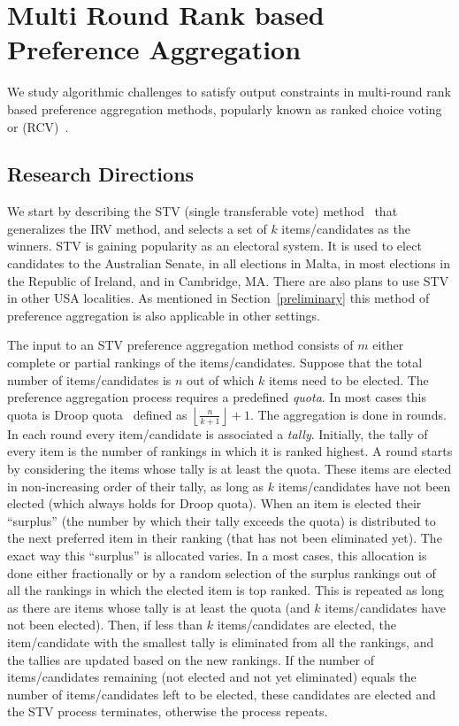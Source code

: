 \documentclass[11pt]{article}
\newcommand{\floor}[1]{\left\lfloor{#1}\right\rfloor}
\begin{document}
%
\vspace{-0.1in}
\section{Multi Round Rank based Preference Aggregation}\label{aim2}
\vspace{-0.1in}
We study algorithmic challenges to satisfy  output constraints in multi-round rank based preference aggregation methods, popularly known as ranked choice voting or (RCV)~\cite{irv1}. 
\vspace{-0.1in}
\subsection{Research Directions}
\vspace{-0.1in}
We start by describing the STV (single transferable vote) method~\cite{stv-irv, stv1} that generalizes the IRV method, and selects a set of $k$ items/candidates as the winners. STV is gaining popularity as an electoral system. It is used to elect candidates to the Australian Senate, in all elections in Malta, in most elections in the Republic of Ireland, and in Cambridge, MA. There are also plans to use STV in other USA localities. As mentioned in Section~\ref{preliminary} this method of preference aggregation is also applicable in other settings.

The input to an STV preference aggregation method consists of $m$ either complete or partial rankings of the items/candidates. Suppose that the total number of items/candidates is $n$ out of which $k$ items need to be elected. The preference aggregation process requires a predefined {\em quota}. In most cases this quota is Droop quota~\cite{droop} defined as $\floor{\frac{n}{k+1}}+1$. The aggregation is done in rounds. In each round every item/candidate is associated a {\em tally}. Initially, the tally of every item is the number of rankings in which it is ranked highest. A round starts by considering the items whose tally is at least the quota. These items are elected in non-increasing order of their tally, as long as $k$ items/candidates have not been elected (which always holds for Droop quota). When an item is elected their ``surplus'' (the number by which their tally exceeds the quota) is distributed to the next preferred item in their ranking (that has not been eliminated yet). The exact way this ``surplus'' is allocated varies. In a most cases, this allocation is done either fractionally or by a random selection of the surplus rankings out of all the  rankings in which the elected item is top ranked. This is repeated as long as there are items whose tally is at least the quota (and $k$ items/candidates have not been elected). 
Then, if less than $k$ items/candidates are elected, the item/candidate with the smallest tally is eliminated from all the rankings, and the tallies are updated based on the new rankings. If the number of items/candidates remaining (not elected and not yet eliminated) equals the
number of items/candidates left to be elected, these candidates are elected and the STV process terminates, otherwise the process repeats.
\end{document}
